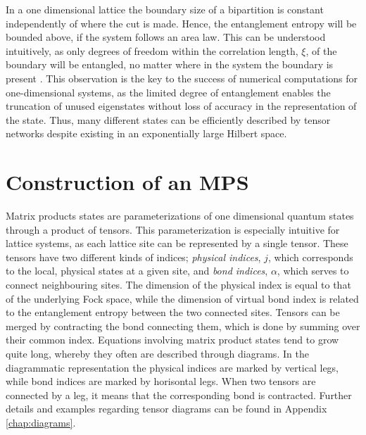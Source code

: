 In a one dimensional lattice the boundary size of a bipartition is constant  independently of where the cut is made. Hence, the entanglement entropy will be bounded above, if the system follows an area law. This can be understood intuitively, as only degrees of freedom within the correlation length, $\xi$, of the boundary will be entangled, no matter where in the system the boundary is present \cite{Hastings2007}. This observation is the key to the success of numerical computations for one-dimensional systems, as the limited degree of entanglement enables the truncation of unused eigenstates without loss of accuracy in the representation of the state. Thus, many different states can be efficiently described by tensor networks despite existing in an exponentially large Hilbert space.


\section{Construction of an MPS} \label{sec:construct_MPS}
Matrix products states are parameterizations of one dimensional quantum states through a product of tensors. This parameterization is especially intuitive for lattice systems, as each lattice site can be represented by a single tensor. These tensors have two different kinds of indices; \textit{physical indices}, $j$, which corresponds to the local, physical states at a given site, and \textit{bond indices}, $\alpha$, which serves to connect neighbouring sites.
The dimension of the physical index is equal to that of the underlying Fock space, while the dimension of virtual bond index is related to the entanglement entropy between the two connected sites.
Tensors can be merged by contracting the bond connecting them, which is done by summing over their common index. Equations involving matrix product states tend to grow quite long, whereby they often are described through diagrams. In the diagrammatic representation the physical indices are marked by vertical legs, while bond indices are marked by horisontal legs. When two tensors are connected by a leg, it means that the corresponding bond is contracted. Further details and examples regarding tensor diagrams can be found in Appendix \ref{chap:diagrams}.

